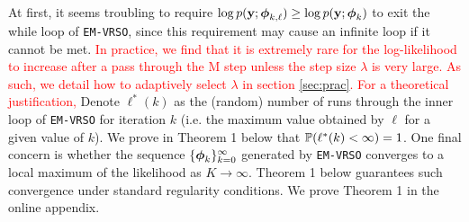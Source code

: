 
At first, it seems troubling to require $\log p(\mathbf{y};\boldsymbol{\phi}_{k,\ell}) \geq \log p(\mathbf{y};\boldsymbol{\phi}_{k})$ to exit the while loop of \texttt{EM-VRSO}, since this requirement may cause an infinite loop if it cannot be met. \textcolor{red}{In practice, we find that it is extremely rare for the log-likelihood to increase after a pass through the M step unless the step size $\lambda$ is very large. As such, we detail how to adaptively select $\lambda$ in section \ref{sec:prac}. For a theoretical justification,} %
Denote $\ell^*(k)$ as the (random) number of runs through the inner loop of \texttt{EM-VRSO} for iteration $k$ (i.e. the maximum value obtained by $\ell$ for a given value of $k$). We prove in Theorem 1 below that 
$\mathbb{P}(\ell^*(k) < \infty) = 1$. %
%
One final concern is whether the sequence $\{\boldsymbol{\phi}_{k}\}_{k=0}^\infty$ generated by \texttt{EM-VRSO} converges to a local maximum of the likelihood as $K \to \infty$. %
Theorem 1 below guarantees such convergence under standard regularity conditions. We prove Theorem 1 in the online appendix. %

    
